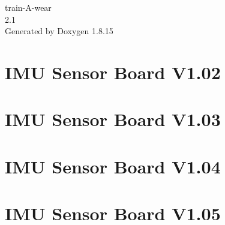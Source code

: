 \let\mypdfximage\pdfximage\def\pdfximage{\immediate\mypdfximage}\documentclass[twoside]{book}
\newcommand{\+}{\discretionary{\mbox{\scriptsize$\hookleftarrow$}}{}{}}
\newcommand{\clearemptydoublepage}{%
  \newpage{\pagestyle{empty}\cleardoublepage}%
}
\begin{document}
\hypersetup{pageanchor=false,
             bookmarksnumbered=true,
             pdfencoding=unicode
            }
\begin{titlepage}
\vspace*{7cm}
\begin{center}%
{\Large train-\/\+A-\/wear \\[1ex]\large 2.\+1 }\\
\vspace*{1cm}
{\large Generated by Doxygen 1.8.15}\\
\end{center}
\end{titlepage}
\clearemptydoublepage
{}
\tableofcontents
\clearemptydoublepage
{}
\hypersetup{pageanchor=true}

\chapter{I\+MU Sensor Board V1.02}
\label{md__d_1_cloned_repo_trainawear_train-_a-wear__hardware__sensor-_board__v102__r_e_a_d_m_e}

\chapter{I\+MU Sensor Board V1.03}
\label{md__d_1_cloned_repo_trainawear_train-_a-wear__hardware__sensor-_board__v103__r_e_a_d_m_e}

\chapter{I\+MU Sensor Board V1.04}
\label{md__d_1_cloned_repo_trainawear_train-_a-wear__hardware__sensor-_board__v104__r_e_a_d_m_e}

\chapter{I\+MU Sensor Board V1.05}
\label{md__d_1_cloned_repo_trainawear_train-_a-wear__hardware__sensor-_board__v105__r_e_a_d_m_e}

\end{document}

